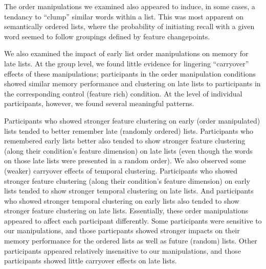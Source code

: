 \documentclass[11pt]{article}
\begin{document}
The order manipulations we examined also appeared to induce, in some cases, a
tendancy to ``clump'' similar words within a list. This was most apparent on
semantically ordered lists, where the probability of initiating recall with a
given word seemed to follow groupings defined by feature changepoints.

We also examined the impact of early list order manipulations on memory for
late lists. At the group level, we found little evidence for lingering
``carryover'' effects of these manipulations; participants in the order
manipulation conditions showed similar memory performance and clustering on
late lists to participants in the corresponding control (feature rich)
condition. At the level of individual participants, however, we found several
meaningful patterns.

Participants who showed stronger feature clustering on early (order
manipulated) lists tended to better remember late (randomly ordered) lists.
Participants who remembered early lists better also tended to show stronger
feature clustering (along their condition's feature dimension) on late lists
(even though the words on those late lists were presented in a random order).
We also observed some (weaker) carryover effects of temporal clustering.
Participants who showed stronger feature clustering (along their condition's
feature dimension) on early lists tended to show stronger temporal clustering
on late lists. And participants who showed stronger temporal clustering on
early lists also tended to show stronger feature clustering on late lists.
Essentially, these order manipulations appeared to affect each participant
differently. Some participants were sensitive to our manipulations, and those
particpants showed stronger impacts on their memory performance for the ordered
lists as well as future (random) lists. Other participants appeared relatively
insensitive to our manipulations, and those participants showed little
carryover effects on late lists.
\end{document}
